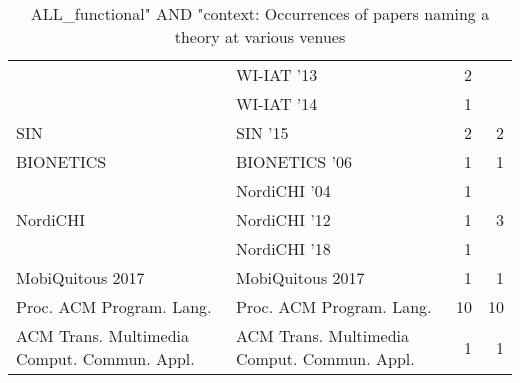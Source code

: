 \begin{table*}[t]
\begin{tabular}{llrr}
& WI-IAT '13 & 2 &\\
& WI-IAT '14 & 1 &\\
\multirow{1}{*}{SIN } & SIN '15 & 2 & \multirow{1}{*}{2}\\
\multirow{1}{*}{BIONETICS } & BIONETICS '06 & 1 & \multirow{1}{*}{1}\\
\multirow{3}{*}{NordiCHI } & NordiCHI '04 & 1 & \multirow{3}{*}{3}\\
& NordiCHI '12 & 1 &\\
& NordiCHI '18 & 1 &\\
\multirow{1}{*}{MobiQuitous 2017} & MobiQuitous 2017 & 1 & \multirow{1}{*}{1}\\
\multirow{1}{*}{Proc. ACM Program. Lang.} & Proc. ACM Program. Lang. & 10 & \multirow{1}{*}{10}\\
\multirow{1}{*}{ACM Trans. Multimedia Comput. Commun. Appl.} & ACM Trans. Multimedia Comput. Commun. Appl. & 1 & \multirow{1}{*}{1}\\
\end{tabular}
\caption{ALL\_functional" AND "context: Occurrences of papers naming a theory at various venues}
\end{table*}